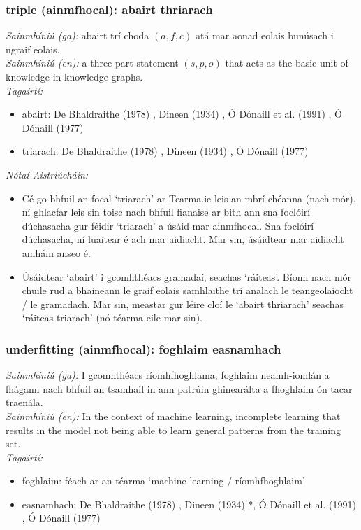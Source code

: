 \subsubsection*{triple (ainmfhocal): abairt thriarach}
 \noindent \textit{Sainmhíniú (ga):} abairt trí choda $(a,f,c)$ atá mar aonad eolais bunúsach i ngraif eolais.
\\
 \noindent \textit{Sainmhíniú (en):} a three-part statement $(s,p,o)$ that acts as the basic unit of knowledge in knowledge graphs.
\\
 \noindent \textit{Tagairtí:}
\begin{itemize}
	\item abairt: De Bhaldraithe (1978) \cite{de-bhaldraithe}, Dineen (1934) \cite{dineen}, Ó Dónaill et al. (1991) \cite{focloir-beag}, Ó Dónaill (1977) \cite{odonaill}
	\item triarach: De Bhaldraithe (1978) \cite{de-bhaldraithe}, Dineen (1934) \cite{dineen}, Ó Dónaill (1977) \cite{odonaill}
\end{itemize}

 \noindent \textit{Nótaí Aistriúcháin:}
\begin{itemize}
	\item Cé go bhfuil an focal `triarach' ar Tearma.ie leis an mbrí chéanna (nach mór), ní ghlacfar leis sin toisc nach bhfuil fianaise ar bith ann sna foclóirí dúchasacha gur féidir `triarach' a úsáid mar ainmfhocal. Sna foclóirí dúchasacha, ní luaitear é ach mar aidiacht. Mar sin, úsáidtear mar aidiacht amháin anseo é.
	\item Úsáidtear `abairt' i gcomhthéacs gramadaí, seachas `ráiteas'. Bíonn nach mór chuile rud a bhaineann le graif eolais samhlaithe trí analach le teangeolaíocht / le gramadach. Mar sin, meastar gur léire cloí le `abairt thriarach' seachas `ráiteas triarach' (nó téarma eile mar sin).
\end{itemize}


\subsubsection*{underfitting (ainmfhocal): foghlaim easnamhach}
 \noindent \textit{Sainmhíniú (ga):} I gcomhthéacs ríomhfhoghlama, foghlaim neamh-iomlán a fhágann nach bhfuil an tsamhail in ann patrúin ghinearálta a fhoghlaim ón tacar traenála.
\\
 \noindent \textit{Sainmhíniú (en):} In the context of machine learning, incomplete learning that results in the model not being able to learn general patterns from the training set.
\\
 \noindent \textit{Tagairtí:}
\begin{itemize}
	\item foghlaim: féach ar an téarma `machine learning / ríomhfhoghlaim'
	\item easnamhach: De Bhaldraithe (1978) \cite{de-bhaldraithe}, Dineen (1934) \cite{dineen}*, Ó Dónaill et al. (1991) \cite{focloir-beag}, Ó Dónaill (1977) \cite{odonaill}
\end{itemize}

